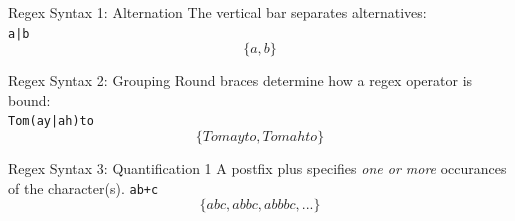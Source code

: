 \documentclass[11pt]{beamer}
\begin{document}
\begin{frame}[fragile=singleslide]{Regex Syntax 1: Alternation}
\center
The vertical bar separates alternatives: \\
\texttt{a|b}
$$ \{a, b\} $$ 
\end{frame}

\begin{frame}[fragile=singleslide]{Regex Syntax 2: Grouping}
\center 
Round braces determine how a regex operator is bound: \\
\texttt{Tom(ay|ah)to} 
$$\{Tomayto,Tomahto\}$$ 
\end{frame}

\begin{frame}[fragile=singleslide]{Regex Syntax 3: Quantification 1}
\center
A postfix plus specifies \emph{one or more} occurances of the character(s). 
\texttt{ab+c} \\
\vspace{0.5em}
$$ \{ abc, abbc, abbbc, ...\} $$ 
\end{frame}
\end{document}
